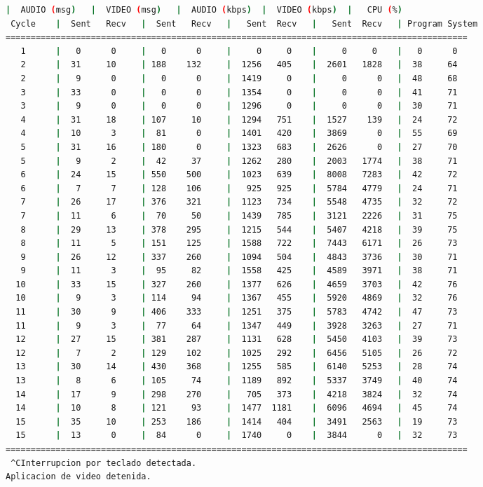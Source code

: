 \begin{adjustbox}{max width=\textwidth}
\begin{lstlisting}[language=bash,basicstyle=\ttfamily\scriptsize]
          |  AUDIO (msg)   |  VIDEO (msg)   |  AUDIO (kbps)  |  VIDEO (kbps)  |   CPU (%)
 Cycle    |  Sent   Recv   |  Sent   Recv   |   Sent  Recv   |   Sent  Recv   | Program System
============================================================================================
   1      |   0      0     |   0      0     |     0     0    |     0     0    |   0      0
   2      |  31     10     | 188    132     |  1256   405    |  2601   1828   |  38     64
   2      |   9      0     |   0      0     |  1419     0    |     0      0   |  48     68
   3      |  33      0     |   0      0     |  1354     0    |     0      0   |  41     71
   3      |   9      0     |   0      0     |  1296     0    |     0      0   |  30     71
   4      |  31     18     | 107     10     |  1294   751    |  1527    139   |  24     72
   4      |  10      3     |  81      0     |  1401   420    |  3869      0   |  55     69
   5      |  31     16     | 180      0     |  1323   683    |  2626      0   |  27     70
   5      |   9      2     |  42     37     |  1262   280    |  2003   1774   |  38     71
   6      |  24     15     | 550    500     |  1023   639    |  8008   7283   |  42     72
   6      |   7      7     | 128    106     |   925   925    |  5784   4779   |  24     71
   7      |  26     17     | 376    321     |  1123   734    |  5548   4735   |  32     72
   7      |  11      6     |  70     50     |  1439   785    |  3121   2226   |  31     75
   8      |  29     13     | 378    295     |  1215   544    |  5407   4218   |  39     75
   8      |  11      5     | 151    125     |  1588   722    |  7443   6171   |  26     73
   9      |  26     12     | 337    260     |  1094   504    |  4843   3736   |  30     71
   9      |  11      3     |  95     82     |  1558   425    |  4589   3971   |  38     71
  10      |  33     15     | 327    260     |  1377   626    |  4659   3703   |  42     76
  10      |   9      3     | 114     94     |  1367   455    |  5920   4869   |  32     76
  11      |  30      9     | 406    333     |  1251   375    |  5783   4742   |  47     73
  11      |   9      3     |  77     64     |  1347   449    |  3928   3263   |  27     71
  12      |  27     15     | 381    287     |  1131   628    |  5450   4103   |  39     73
  12      |   7      2     | 129    102     |  1025   292    |  6456   5105   |  26     72
  13      |  30     14     | 430    368     |  1255   585    |  6140   5253   |  28     74
  13      |   8      6     | 105     74     |  1189   892    |  5337   3749   |  40     74
  14      |  17      9     | 298    270     |   705   373    |  4218   3824   |  32     74
  14      |  10      8     | 121     93     |  1477  1181    |  6096   4694   |  45     74
  15      |  35     10     | 253    186     |  1414   404    |  3491   2563   |  19     73
  15      |  13      0     |  84      0     |  1740     0    |  3844      0   |  32     73
============================================================================================
 ^CInterrupcion por teclado detectada.
Aplicacion de video detenida.


\end{lstlisting}
\end{adjustbox}
